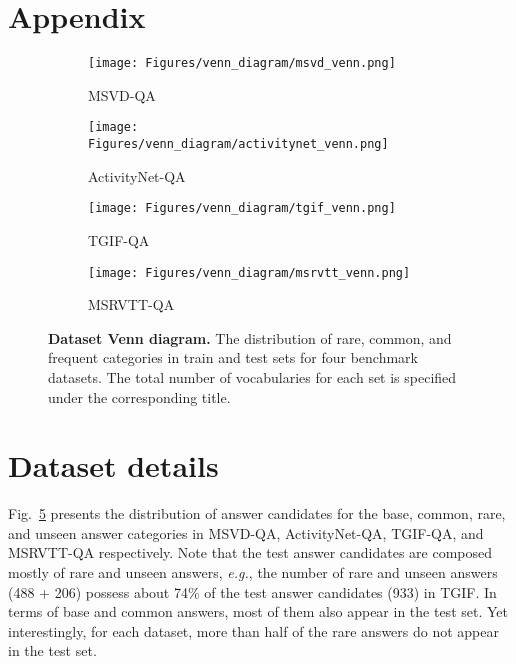 \documentclass[10pt,twocolumn,letterpaper]{article}
\begin{document}
\section*{\Large Appendix}
\begin{figure}[t] 
    \centering
    \begin{subfigure}[t]{0.495\linewidth}
        \texttt{[image: Figures/venn\_diagram/msvd\_venn.png]}
        \caption{MSVD-QA}
        \label{fig:msvd_venn}
    \end{subfigure}
    \begin{subfigure}[t]{0.495\linewidth}
        \texttt{[image: Figures/venn\_diagram/activitynet\_venn.png]}
        \caption{ActivityNet-QA}
        
        \label{fig:activitynet_venn}
    \end{subfigure}
        \begin{subfigure}[t]{0.495\linewidth}
        \texttt{[image: Figures/venn\_diagram/tgif\_venn.png]}
        \caption{TGIF-QA}
        \label{fig:tgif_venn}
    \end{subfigure}
    \begin{subfigure}[t]{0.495\linewidth}
        \texttt{[image: Figures/venn\_diagram/msrvtt\_venn.png]}
        \caption{MSRVTT-QA}
        
        \label{fig:mstvtt_venn}
    \end{subfigure}
    \caption{\textbf{Dataset Venn diagram.}
     The distribution of rare, common, and frequent categories in train and test sets for four benchmark datasets. 
     The total number of vocabularies for each set is specified under the corresponding title.
    }
    \label{fig:venn_diagram}
\end{figure} \section{Dataset details}
Fig.~\ref{fig:venn_diagram} presents the distribution of answer candidates for the base, common, rare, and unseen answer categories in MSVD-QA, ActivityNet-QA, TGIF-QA, and MSRVTT-QA respectively. 
Note that the test answer candidates are composed mostly of rare and unseen answers, \textit{e.g.}, the number of rare and unseen answers (488 + 206) possess about 74\% of the test answer candidates (933) in TGIF.
In terms of base and common answers, most of them also appear in the test set.
Yet interestingly, for each dataset, more than half of the rare answers do not appear in the test set.
\end{document}
